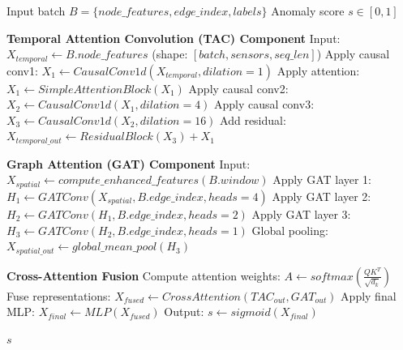 \documentclass[conference]{IEEEtran}
\begin{document}
\begin{algorithm}[H]
\caption{GTiS-Net Model Architecture}
\begin{algorithmic}[1]
\REQUIRE Input batch $B = \{node\_features, edge\_index, labels\}$
\ENSURE Anomaly score $s \in [0,1]$

\STATE \textbf{Temporal Attention Convolution (TAC) Component}
\STATE Input: $X_{temporal} \leftarrow B.node\_features$ (shape: $[batch, sensors, seq\_len]$)
\STATE Apply causal conv1: $X_1 \leftarrow CausalConv1d(X_{temporal}, dilation=1)$
\STATE Apply attention: $X_1 \leftarrow SimpleAttentionBlock(X_1)$
\STATE Apply causal conv2: $X_2 \leftarrow CausalConv1d(X_1, dilation=4)$
\STATE Apply causal conv3: $X_3 \leftarrow CausalConv1d(X_2, dilation=16)$
\STATE Add residual: $X_{temporal\_out} \leftarrow ResidualBlock(X_3) + X_1$

\STATE \textbf{Graph Attention (GAT) Component}
\STATE Input: $X_{spatial} \leftarrow compute\_enhanced\_features(B.window)$
\STATE Apply GAT layer 1: $H_1 \leftarrow GATConv(X_{spatial}, B.edge\_index, heads=4)$
\STATE Apply GAT layer 2: $H_2 \leftarrow GATConv(H_1, B.edge\_index, heads=2)$
\STATE Apply GAT layer 3: $H_3 \leftarrow GATConv(H_2, B.edge\_index, heads=1)$
\STATE Global pooling: $X_{spatial\_out} \leftarrow global\_mean\_pool(H_3)$

\STATE \textbf{Cross-Attention Fusion}
\STATE Compute attention weights: $A \leftarrow softmax(\frac{QK^T}{\sqrt{d_k}})$
\STATE Fuse representations: $X_{fused} \leftarrow CrossAttention(TAC_{out}, GAT_{out})$
\STATE Apply final MLP: $X_{final} \leftarrow MLP(X_{fused})$
\STATE Output: $s \leftarrow sigmoid(X_{final})$

\RETURN $s$
\end{algorithmic}
\end{algorithm}
\end{document}
